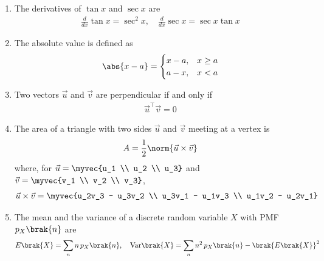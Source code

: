 \begin{enumerate}[label=\thesubsection.\arabic*, ref=\thesubsection.\theenumi]
\begin{align}
\end{align}
\solution
Multiplying the numerator and the denominator by $\cos x$ gives the first identity. For the second,
\begin{align}
	\frac{1}{1 + \sin x} = \frac{1 - \sin x}{1 - \sin^2 x} = \frac{1 - \sin x}{\cos^2 x}
\end{align}
which equals $\sec^2 x - \sec x\tan x$.
\item The derivatives of $\tan x$ and $\sec x$ are
\begin{align}
	\frac{d}{dx}\tan x = \sec^2 x, \quad \frac{d}{dx}\sec x = \sec x\tan x
	\label{eq:EE26BTECH11229-deriv-sec}
\end{align}
\item The absolute value is defined as
\begin{align}
	\abs{x - a} = \begin{cases}
		x - a, & x \ge a
		\\
		a - x, & x < a
	\end{cases}
	\label{eq:EE26BTECH11229-abs-def}
\end{align}
\item Two vectors $\vec{u}$ and $\vec{v}$ are perpendicular if and only if
\begin{align}
	\vec{u}^{\top}\vec{v} = 0
	\label{eq:EE26BTECH11229-perp-vec}
\end{align}
\item The area of a triangle with two sides $\vec{u}$ and $\vec{v}$ meeting at a vertex is
\begin{align}
	A = \frac{1}{2}\norm{\vec{u}\times\vec{v}}
	\label{eq:EE26BTECH11229-area-cross}
\end{align}
where, for $\vec{u} = \myvec{u_1 \\ u_2 \\ u_3}$ and $\vec{v} = \myvec{v_1 \\ v_2 \\ v_3}$,
\begin{align}
	\vec{u}\times\vec{v} = \myvec{u_2v_3 - u_3v_2 \\ u_3v_1 - u_1v_3 \\ u_1v_2 - u_2v_1}
\end{align}
\item The mean and the variance of a discrete random variable $X$ with PMF $p_X\brak{n}$ are
\begin{align}
	E\brak{X} = \sum_{n}n\,p_X\brak{n}, \quad
	\text{Var}\brak{X} = \sum_{n}n^2\,p_X\brak{n} - \brak{E\brak{X}}^2
	\label{eq:EE26BTECH11229-mean-var}
\end{align}


\end{enumerate}
